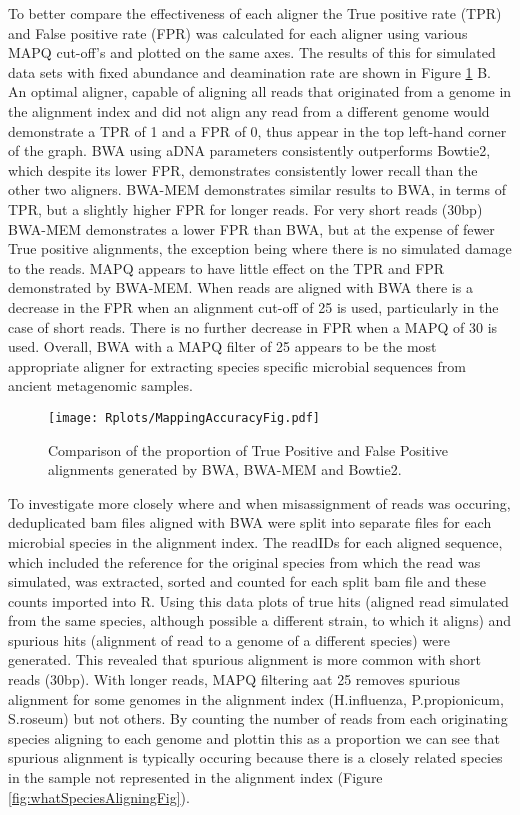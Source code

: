 \documentclass[12pt, a4paper]{article}
\begin{document}
To better compare the effectiveness of each aligner the True positive rate (TPR) and False positive rate (FPR) was calculated for each aligner using various MAPQ cut-off's and plotted on the same axes. 
The results of this for simulated data sets with fixed abundance and deamination rate are shown in Figure \ref{fig:mappingAccuracy} B. 
An optimal aligner, capable of aligning all reads that originated from a genome in the alignment index and did not align any read from a different genome would demonstrate a TPR of 1 and a FPR of 0, thus appear in the top left-hand corner of the graph. 
BWA using aDNA parameters consistently outperforms Bowtie2, which despite its lower FPR, demonstrates consistently lower recall than the other two aligners. 
BWA-MEM demonstrates similar results to BWA, in terms of TPR, but a slightly higher FPR for longer reads. For very short reads (30bp) BWA-MEM demonstrates a lower FPR than BWA, but at the expense of fewer True positive alignments, the exception being where there is no simulated damage to the reads. 
MAPQ appears to have little effect on the TPR and FPR demonstrated by BWA-MEM. 
When reads are aligned with BWA there is a decrease in the FPR when an alignment cut-off of 25 is used, particularly in the case of short reads. 
There is no further decrease in FPR when a MAPQ of 30 is used. 
Overall, BWA with a MAPQ filter of 25 appears to be the most appropriate aligner for extracting species specific microbial sequences from ancient metagenomic samples.  

\begin{figure}[ht!]
	\centering
	\texttt{[image: Rplots/MappingAccuracyFig.pdf]}
	\small\caption{Comparison of the proportion of True Positive and False Positive alignments generated by BWA, BWA-MEM and Bowtie2.}\label{fig:mappingAccuracy}
\end{figure}
\clearpage

To investigate more closely where and when misassignment of reads was occuring, deduplicated bam files aligned with BWA were split into separate files for each microbial species in the alignment index. 
The readIDs for each aligned sequence, which included the reference for the original species from which the read was simulated, was extracted, sorted and counted for each split bam file and these counts imported into R.
Using this data plots of true hits (aligned read simulated from the same species, although possible a different strain, to which it aligns) and spurious hits (alignment of read to a genome of a different species) were generated.
This revealed that spurious alignment is more common with short reads (30bp). 
With longer reads, MAPQ filtering aat 25 removes spurious alignment for some genomes in the alignment index (H.influenza, P.propionicum, S.roseum) but not others. 
By counting the number of reads from each originating species aligning to each genome and plottin this as a proportion we can see that spurious alignment is typically occuring because there is a closely related species in the sample not represented in the alignment index (Figure \ref{fig:whatSpeciesAligningFig}).
\end{document}
